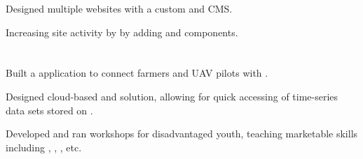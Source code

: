 \documentclass[]{hackathons}
\begin{document}
\begin{minipage}[t]{0.66\textwidth}
\begin{tightemize}
\item Designed multiple websites with a custom  and  CMS.
\item Increasing site activity by  by adding  and  components.
\end{tightemize}
\small


\section{}
\begin{tightemize}
\item Built a application to connect farmers and UAV pilots with .
\item Designed cloud-based  and  solution, allowing for quick accessing of time-series data sets stored on .
\end{tightemize}
\medskip

\begin{tightemize}
\item Developed and ran workshops for disadvantaged youth, teaching marketable skills including , , , etc.
\end{tightemize}


%
%

\end{minipage} 
\hfill
\end{document}
